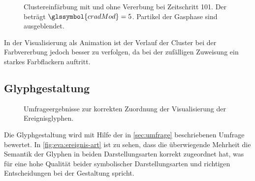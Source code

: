 \begin{figure}
	{\caption{Clustereinfärbung mit und ohne Vererbung bei Zeitschritt 101. Der  beträgt $\glssymbol{cradMod} = 5$. Partikel der Gasphase sind ausgeblendet.}\label{fig:eva:clusterfarbe}}
\end{figure}

In der Visualisierung als Animation ist der Verlauf der Cluster bei der Farbvererbung jedoch besser zu verfolgen, da bei der zufälligen Zuweisung ein starkes Farbflackern auftritt.


\subsection*{Glyphgestaltung}\label{sec:eva:glyphgestaltung}

\begin{figure}
	{\caption{Umfrageergebnisse zur korrekten Zuordnung der Visualisierung der Ereignisglyphen.}\label{fig:eva:ereignis}}
\end{figure}

Die Glyphgestaltung wird mit Hilfe der in \autoref{sec:umfrage} beschriebenen Umfrage bewertet. In \autoref{fig:eva:ereignis-art} ist zu sehen, dass die überwiegende Mehrheit die Semantik der Glyphen in beiden Darstellungsarten korrekt zugeordnet hat, was für eine hohe Qualität beider symbolischer Darstellungsarten und richtigen Entscheidungen bei der Gestaltung spricht. %

